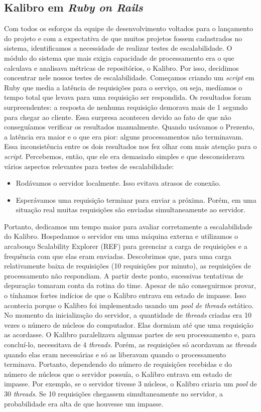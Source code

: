 \documentclass{llncs}
\begin{document}
  \subsection{Kalibro em \textit{Ruby on Rails}}
  Com todos os esforços da equipe de desenvolvimento voltados para o lançamento do projeto e com a expectativa de que muitos projetos fossem cadastrados no sistema, identificamos a necessidade de realizar testes de escalabilidade. O módulo do sistema que mais exigia capacidade de processamento era o que calculava e analisava métricas de repositórios, o Kalibro. Por isso, decidimos concentrar nele nossos testes de escalabilidade.
  Começamos criando um \textit{script} em Ruby que media a latência de requisições para o serviço, ou seja, medíamos o tempo total que levava para uma requisição ser respondida. Os resultados foram surpreendentes: a resposta de nenhuma requisição demorava mais de 1 segundo para chegar ao cliente. Essa surpresa aconteceu devido ao fato de que não conseguíamos verificar os resultados manualmente. Quando usávamos o Prezento, a latência era maior e o que era pior: alguns processamentos não terminavam. Essa inconsistência entre os dois resultados nos fez olhar com mais atenção para o \textit{script}. Percebemos, então, que ele era demasiado simples e que desconsiderava vários aspectos relevantes para testes de escalabilidade:
  \begin{itemize}
    \item Rodávamos o servidor localmente. Isso evitava atrasos de conexão.
    \item Esperávamos uma requisição terminar para enviar a próxima. Porém, em uma situação real muitas requisições são enviadas simultaneamente ao servidor.
  \end{itemize}
  Portanto, dedicamos um tempo maior para avaliar corretamente a escalabilidade do Kalibro. Hospedamos o servidor em uma máquina externa e utilizamos o arcabouço Scalability Explorer (REF) para gerenciar a carga de requisições e a frequência com que elas eram enviadas. Descobrimos que, para uma carga relativamente baixa de requisições (10 requisições por minuto), as requisições de processamento não respondiam. A partir deste ponto, sucessivas tentativas de depuração tomaram conta da rotina do time. Apesar de não conseguirmos provar, o tínhamos fortes indícios de que o Kalibro entrava em estado de impasse. Isso acontecia porque o Kalibro foi implementado usando um \textit{pool de threads} estático. No momento da inicialização do servidor, a quantidade de \textit{threads} criadas era 10 vezes o número de núcleos do computador. Elas dormiam até que uma requisição as acordasse. O Kalibro paralelizava algumas partes de seu processamento e, para concluí-lo, necessitava de 4 \textit{threads}. Porém, as requisições só acordavam as \textit{threads} quando elas eram necessárias e só as liberavam quando o processamento terminava. Portanto, dependendo do número de requisições recebidas e do número de núcleos que o servidor possuía, o Kalibro entrava em estado de impasse. Por exemplo, se o servidor tivesse 3 núcleos, o Kalibro criaria um \textit{pool} de 30 \textit{threads}. Se 10 requisições chegassem simultaneamente no servidor, a probabilidade era alta de que houvesse um impasse.
\end{document}
